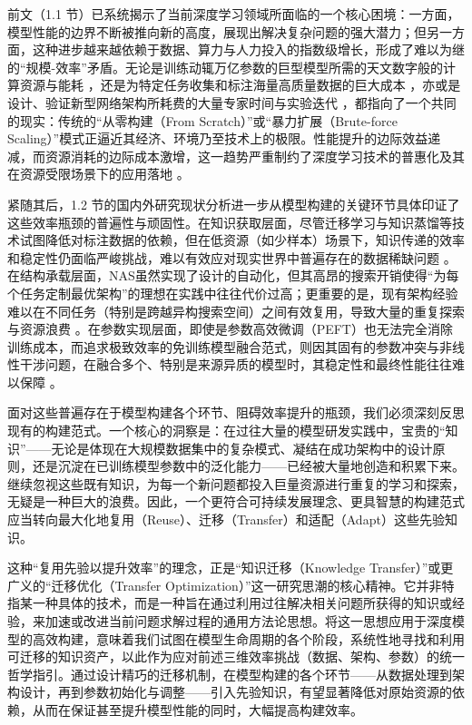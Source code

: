 \documentclass[../main.tex]{subfiles}
\begin{document}

前文（1.1 节）已系统揭示了当前深度学习领域所面临的一个核心困境：一方面，模型性能的边界不断被推向新的高度，展现出解决复杂问题的强大潜力；但另一方面，这种进步越来越依赖于数据、算力与人力投入的指数级增长，形成了难以为继的“规模-效率”矛盾。无论是训练动辄万亿参数的巨型模型所需的天文数字般的计算资源与能耗 ，还是为特定任务收集和标注海量高质量数据的巨大成本 ，亦或是设计、验证新型网络架构所耗费的大量专家时间与实验迭代 ，都指向了一个共同的现实：传统的“从零构建（From Scratch）”或“暴力扩展（Brute-force Scaling）”模式正逼近其经济、环境乃至技术上的极限。性能提升的边际效益递减，而资源消耗的边际成本激增，这一趋势严重制约了深度学习技术的普惠化及其在资源受限场景下的应用落地 。

紧随其后，1.2 节的国内外研究现状分析进一步从模型构建的关键环节具体印证了这些效率瓶颈的普遍性与顽固性。在知识获取层面，尽管迁移学习与知识蒸馏等技术试图降低对标注数据的依赖，但在低资源（如少样本）场景下，知识传递的效率和稳定性仍面临严峻挑战，难以有效应对现实世界中普遍存在的数据稀缺问题 。在结构承载层面，NAS虽然实现了设计的自动化，但其高昂的搜索开销使得“为每个任务定制最优架构”的理想在实践中往往代价过高；更重要的是，现有架构经验难以在不同任务（特别是跨越异构搜索空间）之间有效复用，导致大量的重复探索与资源浪费 。在参数实现层面，即使是参数高效微调（PEFT）也无法完全消除训练成本，而追求极致效率的免训练模型融合范式，则因其固有的参数冲突与非线性干涉问题，在融合多个、特别是来源异质的模型时，其稳定性和最终性能往往难以保障 。

面对这些普遍存在于模型构建各个环节、阻碍效率提升的瓶颈，我们必须深刻反思现有的构建范式。一个核心的洞察是：在过往大量的模型研发实践中，宝贵的“知识”——无论是体现在大规模数据集中的复杂模式、凝结在成功架构中的设计原则，还是沉淀在已训练模型参数中的泛化能力——已经被大量地创造和积累下来。继续忽视这些既有知识，为每一个新问题都投入巨量资源进行重复的学习和探索，无疑是一种巨大的浪费。因此，一个更符合可持续发展理念、更具智慧的构建范式应当转向最大化地复用（Reuse）、迁移（Transfer）和适配（Adapt）这些先验知识。

这种“复用先验以提升效率”的理念，正是“知识迁移（Knowledge Transfer）”或更广义的“迁移优化（Transfer Optimization）”这一研究思潮的核心精神。它并非特指某一种具体的技术，而是一种旨在通过利用过往解决相关问题所获得的知识或经验，来加速或改进当前问题求解过程的通用方法论思想。将这一思想应用于深度模型的高效构建，意味着我们试图在模型生命周期的各个阶段，系统性地寻找和利用可迁移的知识资产，以此作为应对前述三维效率挑战（数据、架构、参数）的统一哲学指引。通过设计精巧的迁移机制，在模型构建的各个环节——从数据处理到架构设计，再到参数初始化与调整——引入先验知识，有望显著降低对原始资源的依赖，从而在保证甚至提升模型性能的同时，大幅提高构建效率。
\end{document}
